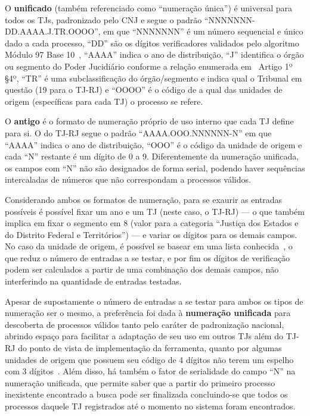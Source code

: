 O \textbf{unificado} (também referenciado como ``numeração única'') é universal
para todos os TJs, padronizado pelo CNJ
\cite{spec:cnj-numeração-única,spec:cnj-numeração-única-resolução} e segue o
padrão ``NNNNNNN-DD.AAAA.J.TR.OOOO'', em que ``NNNNNNN'' é um número sequencial
e único dado a cada processo, ``DD'' são os dígitos verificadores validados
pelo algoritmo Módulo 97 Base 10~\cite{spec:iso-modulo-97}, ``AAAA'' indica o
ano de distribuição, ``J'' identifica o órgão ou segmento do Poder Jucidiário
conforme a relação enumerada em~\cite{spec:cnj-numeração-única-resolução}
Artigo 1º \S 4º, ``TR'' é uma subclassificação do órgão/segmento e indica qual
o Tribunal em questão (19 para o TJ-RJ) e ``OOOO'' é o código de a qual das
unidades de origem (específicas para cada TJ) o processo se refere.

O \textbf{antigo} é o formato de numeração próprio de uso interno que cada TJ
define para si. O do TJ-RJ segue o padrão ``AAAA.OOO.NNNNNN-N'' em que ``AAAA''
indica o ano de distribuição, ``OOO'' é o código da unidade de origem e cada
``N'' restante é um dígito de 0 a 9. Diferentemente da numeração unificada, os
campos com ``N'' não são designados de forma serial, podendo haver sequências
intercaladas de números que não correspondam a processos válidos.

Considerando ambos os formatos de numeração, para se exaurir as entradas
possíveis é possível fixar um ano e um TJ (neste caso, o TJ-RJ) --- o que
também implica em fixar o segmento em 8 (valor para a categoria ``Justiça dos
Estados e do Distrito Federal e Territórios'') --- e variar os dígitos para os
demais campos. No caso da unidade de origem, é possível se basear em uma lista
conhecida~\cite{spec:tjrj-codigos-unidades-de-origem}, o que reduz o número de
entradas a se testar, e por fim os dígitos de verificação podem ser calculados
a partir de uma combinação dos demais campos, não interferindo na quantidade de
entradas testadas.

Apesar de supostamente o número de entradas a se testar para ambos os tipos de
numeração ser o mesmo, a preferência foi dada à \textbf{numeração unificada}
para descoberta de processos válidos tanto pelo caráter de padronização
nacional, abrindo espaço para facilitar a adaptação de seu uso em outros TJs
além do TJ-RJ do ponto de vista de implementação da ferramenta, quanto por
algumas unidades de origem que possuem seu código de 4 dígitos não terem um
espelho com 3 dígitos~\cite{spec:tjrj-codigos-unidades-de-origem}. Além disso,
há também o fator de serialidade do campo ``N'' na numeração unificada, que
permite saber que a partir do primeiro processo inexistente encontrado a busca
pode ser finalizada concluindo-se que todos os processos daquele TJ registrados
até o momento no sistema foram encontrados.

